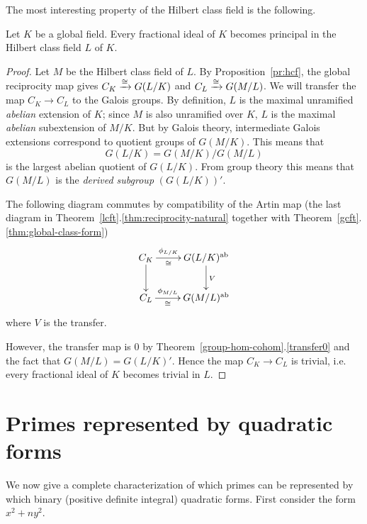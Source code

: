 The most interesting property of the Hilbert class field is the following.
\begin{thm}
Let $K$ be a global field. Every fractional ideal of $K$ becomes principal in the Hilbert class field $L$ of $K$.
\end{thm}
\begin{proof}
Let $M$ be the Hilbert class field of $L$.
By Proposition~\ref{pr:hcf}, the global reciprocity map gives $C_K\xrightarrow{\cong} G(L/K)$ and $C_L\xrightarrow{\cong} G(M/L)$. We will transfer the map $C_K\to C_L$ to the Galois groups. %
By definition, $L$ is the maximal unramified {\it abelian} extension of $K$; since $M$ is also unramified over $K$, $L$ is the %
maximal {\it abelian} subextension of $M/K$. But by Galois theory, %
intermediate Galois extensions %
correspond to quotient groups of $G(M/K)$. This means that 
\[G(L/K)=G(M/K)/G(M/L)\]
is the largest abelian quotient of $G(L/K)$. From group theory this means that $G(M/L)$ is the {\it derived subgroup} $(G(L/K))'$. 

The following diagram commutes by compatibility of the Artin map (the last diagram in Theorem~\ref{lcft}.\ref{thm:reciprocity-natural} together with Theorem~\ref{gcft}.\ref{thm:global-class-form})%
\[
\xymatrix{
C_K \ar[r]^-{\phi_{L/K}}_-{\cong}\ar[d]& G(L/K)\abe\ar[d]^{V}\\
C_L \ar[r]^-{\phi_{M/L}}_-{\cong} & G(M/L)\abe
}
\]
where $V$ is the transfer.

However, the transfer map is 0 by Theorem~\ref{group-hom-cohom}.\ref{transfer0} and the fact that $G(M/L)=G(L/K)'$. Hence the map $C_K\to C_L$ is trivial, i.e. every fractional ideal of $K$ becomes trivial in $L$.
\end{proof}
\section{Primes represented by quadratic forms}
We now give a complete characterization of which primes can be represented by which binary (positive definite integral) quadratic forms. First consider the form $x^2+ny^2$.

